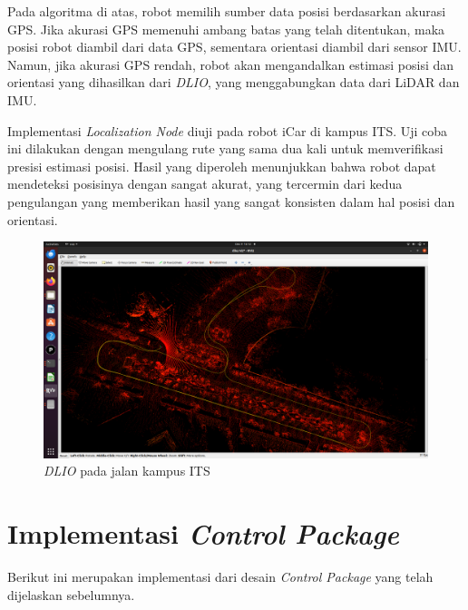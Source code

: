 Pada algoritma di atas, robot memilih sumber data posisi berdasarkan akurasi GPS. Jika akurasi GPS memenuhi ambang batas yang telah ditentukan, maka posisi robot diambil dari data GPS, sementara orientasi diambil dari sensor IMU. Namun, jika akurasi GPS rendah, robot akan mengandalkan estimasi posisi dan orientasi yang dihasilkan dari \emph{DLIO}, yang menggabungkan data dari LiDAR dan IMU.

Implementasi \emph{Localization Node} diuji pada robot iCar di kampus ITS. Uji coba ini dilakukan dengan mengulang rute yang sama dua kali untuk memverifikasi presisi estimasi posisi. Hasil yang diperoleh menunjukkan bahwa robot dapat mendeteksi posisinya dengan sangat akurat, yang tercermin dari kedua pengulangan yang memberikan hasil yang sangat konsisten dalam hal posisi dan orientasi.

\begin{figure}[H] 
  \centering
  \includegraphics[scale=0.22]{gambar/dlio_its.png}
  \caption{\emph{DLIO} pada jalan kampus ITS}
  \label{fig:DLIO pada jalan kampus ITS}
\end{figure}

\section{Implementasi \emph{Control Package}}
Berikut ini merupakan implementasi dari desain \emph{Control Package} yang telah dijelaskan sebelumnya.

